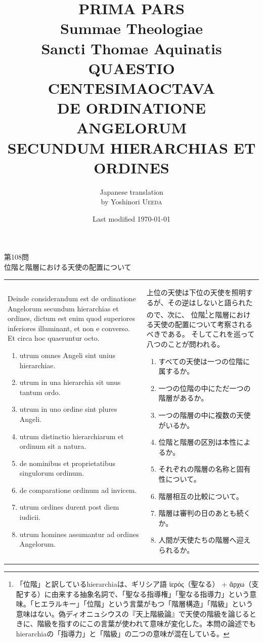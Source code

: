 \documentclass[paper=a4paper,fontsize=10pt,jafontsize=9pt,titlepage]{jlreq}
\title{{\bfseries PRIMA PARS}\\{\Huge Summae Theologiae}\\Sancti Thomae
Aquinatis\\{\sffamily QUAESTIO CENTESIMAOCTAVA}\\DE ORDINATIONE ANGELORUM\\SECUNDUM HIERARCHIAS ET ORDINES}
\author{Japanese translation\\by Yoshinori {\scshape Ueeda}}
\date{Last modified \today}
\begin{document}
\maketitle
\pagestyle{fancy}

\begin{center}
{\Large 第108問\\位階と階層における天使の配置について}\\
\end{center}

\begin{longtable}{p{21em}p{21em}}
Deinde considerandum est de ordinatione Angelorum secundum hierarchias
et ordines, dictum est enim quod superiores inferiores illuminant, et
non e converso. Et circa hoc quaeruntur octo. 

\begin{enumerate}
 \item utrum omnes Angeli sint unius hierarchiae. 
 \item utrum in una hierarchia sit unus tantum ordo.
 \item utrum in uno ordine sint plures Angeli.
 \item utrum distinctio hierarchiarum et ordinum sit a natura.
 \item de nominibus et proprietatibus singulorum ordinum.
 \item de comparatione ordinum ad invicem.
 \item utrum ordines durent post diem iudicii.
 \item utrum homines assumantur ad ordines Angelorum.
\end{enumerate}

&

上位の天使は下位の天使を照明するが、その逆はしないと語られたので、次に、
位階\footnote{「位階」と訳しているhierarchiaは、ギリシア語 ἱερός（聖なる） + ἄρχω（支配する）に由来する抽象名詞で、「聖なる指導権」「聖なる指導力」という意味。「ヒエラルキー」「位階」という言葉がもつ「階層構造」「階級」という意味はない。偽ディオニュシウスの『天上階級論』で天使の階級を論じるときに、階級を指すのにこの言葉が使われて意味が変化した。本問の論述でもhierarchiaの「指導力」と「階級」の二つの意味が混在している。}と階層における天使の配置について考察されるべきである。
そしてこれを巡って八つのことが問われる。

\begin{enumerate}
 \item すべての天使は一つの位階に属するか。
 \item 一つの位階の中にただ一つの階層があるか。
 \item 一つの階層の中に複数の天使がいるか。
 \item 位階と階層の区別は本性によるか。
 \item それぞれの階層の名称と固有性について。
 \item 階層相互の比較について。
 \item 階層は審判の日のあとも続くか。
 \item 人間が天使たちの階層へ迎えられるか。
\end{enumerate}

\end{longtable}
\newpage
\end{document}
